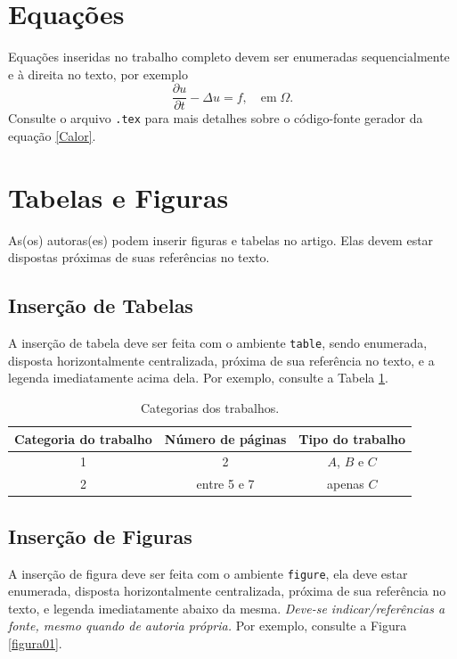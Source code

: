 \documentclass{pssbmac}
\begin{document}
\section{Equações}

Equações inseridas no trabalho completo devem ser enumeradas sequencialmente e à direita no texto, por exemplo
\begin{equation}
\frac{\partial u}{\partial t}-\Delta u = f, \quad  \mathrm{em} \; \Omega. \label{Calor}
\end{equation}
Consulte o arquivo \verb!.tex! para mais detalhes sobre o código-fonte gerador da equação \eqref{Calor}.

\section{Tabelas e Figuras}

As(os) autoras(es) podem inserir figuras e tabelas no artigo. Elas devem estar dispostas próximas de suas referências no texto.

\subsection{Inserção de Tabelas}

A inserção de tabela deve ser feita com o ambiente \verb!table!, sendo enumerada, disposta horizontalmente centralizada, próxima de sua referência no texto, e a legenda imediatamente acima dela. Por exemplo, consulte a Tabela \ref{tabela01}.

\begin{table}[H]
\caption{ {\small Categorias dos trabalhos.}}
\centering
\begin{tabular}{ccc}
\hline
Categoria do trabalho  & Número de páginas & Tipo do trabalho\\ \hline
1          & 2  & $A$, $B$ e $C$    \\
2          & entre 5 e 7  & apenas $C$ \\
\hline
\end{tabular}\label{tabela01}
\end{table}

\subsection{Inserção de Figuras}

A inserção de figura deve ser feita com o ambiente \verb!figure!, ela deve estar enumerada, disposta horizontalmente centralizada, próxima de sua referência no texto, e legenda imediatamente abaixo da mesma. \emph{Deve-se indicar/referências a fonte, mesmo quando de autoria própria.} Por exemplo, consulte a Figura \ref{figura01}.
\end{document}
